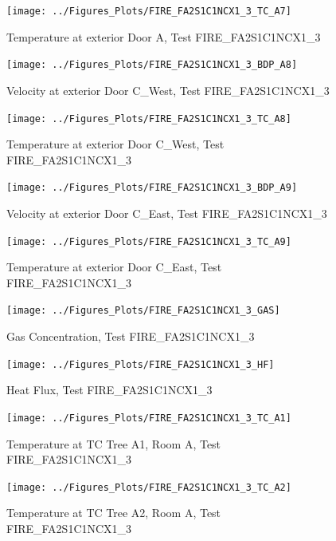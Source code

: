 \documentclass[11pt,oneside]{book}
\begin{document}
\begin{figure}[!ht]
\texttt{[image: ../Figures\_Plots/FIRE\_FA2S1C1NCX1\_3\_TC\_A7]}
\caption{Temperature at exterior Door A, Test FIRE\_FA2S1C1NCX1\_3}
\label{fig:FIRE_FA2S1C1NCX1_3_TC_A7}
\end{figure}

\begin{figure}[!ht]
\texttt{[image: ../Figures\_Plots/FIRE\_FA2S1C1NCX1\_3\_BDP\_A8]}
\caption{Velocity at exterior Door C\_West, Test FIRE\_FA2S1C1NCX1\_3}
\label{fig:FIRE_FA2S1C1NCX1_3_BDP_A8}
\end{figure}

\begin{figure}[!ht]
\texttt{[image: ../Figures\_Plots/FIRE\_FA2S1C1NCX1\_3\_TC\_A8]}
\caption{Temperature at exterior Door C\_West, Test FIRE\_FA2S1C1NCX1\_3}
\label{fig:FIRE_FA2S1C1NCX1_3_TC_A8}
\end{figure}

\begin{figure}[!ht]
\texttt{[image: ../Figures\_Plots/FIRE\_FA2S1C1NCX1\_3\_BDP\_A9]}
\caption{Velocity at exterior Door C\_East, Test FIRE\_FA2S1C1NCX1\_3}
\label{fig:FIRE_FA2S1C1NCX1_3_BDP_A9}
\end{figure}

\begin{figure}[!ht]
\texttt{[image: ../Figures\_Plots/FIRE\_FA2S1C1NCX1\_3\_TC\_A9]}
\caption{Temperature at exterior Door C\_East, Test FIRE\_FA2S1C1NCX1\_3}
\label{fig:FIRE_FA2S1C1NCX1_3_TC_A9}
\end{figure}

\begin{figure}[!ht]
\texttt{[image: ../Figures\_Plots/FIRE\_FA2S1C1NCX1\_3\_GAS]}
\caption{Gas Concentration, Test FIRE\_FA2S1C1NCX1\_3}
\label{fig:FIRE_FA2S1C1NCX1_3_GAS}
\end{figure}

\begin{figure}[!ht]
\texttt{[image: ../Figures\_Plots/FIRE\_FA2S1C1NCX1\_3\_HF]}
\caption{Heat Flux, Test FIRE\_FA2S1C1NCX1\_3}
\label{fig:FIRE_FA2S1C1NCX1_3_HF}
\end{figure}

\begin{figure}[!ht]
\texttt{[image: ../Figures\_Plots/FIRE\_FA2S1C1NCX1\_3\_TC\_A1]}
\caption{Temperature at TC Tree A1, Room A, Test FIRE\_FA2S1C1NCX1\_3}
\label{fig:FIRE_FA2S1C1NCX1_3_TC_A1}
\end{figure}

\begin{figure}[!ht]
\texttt{[image: ../Figures\_Plots/FIRE\_FA2S1C1NCX1\_3\_TC\_A2]}
\caption{Temperature at TC Tree A2, Room A, Test FIRE\_FA2S1C1NCX1\_3}
\label{fig:FIRE_FA2S1C1NCX1_3_TC_A2}
\end{figure}
\end{document}
